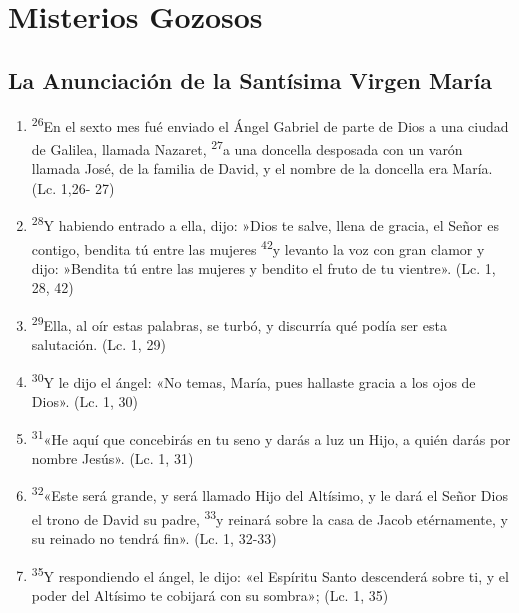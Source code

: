 \documentclass[a4paper,11pt]{article}
\begin{document}
  \section*{\hfil Misterios Gozosos \hfil}
    
    \subsection*{\hfil La Anunciación de la Santísima Virgen María \hfil}

      \begin{enumerate}
        \item \textsuperscript{26}En el sexto mes fué enviado el Ángel Gabriel de parte de Dios a una ciudad de Galilea, llamada Nazaret, \textsuperscript{27}a una 
        doncella desposada con un varón llamada José, de la familia de David, y el nombre de la doncella era María. (Lc. 1,26- 27)

        \item \textsuperscript{28}Y habiendo entrado a ella, dijo: »Dios te salve, llena de gracia, el Señor es contigo, bendita tú entre las mujeres 
        \textsuperscript{42}y levanto la voz con gran clamor y dijo: »Bendita tú entre las mujeres y bendito el fruto de tu vientre». (Lc. 1, 28, 42)

        \item \textsuperscript{29}Ella, al oír estas palabras, se turbó, y discurría qué podía ser esta salutación. (Lc. 1, 29)

        \item \textsuperscript{30}Y le dijo el ángel: «No temas, María, pues hallaste gracia a los ojos de Dios». (Lc. 1, 30)

        \item \textsuperscript{31}«He aquí que concebirás en tu seno y darás a luz un Hijo, a quién darás por nombre Jesús». (Lc. 1, 31)

        \item \textsuperscript{32}«Este será grande, y será llamado Hijo del Altísimo, y le dará el Señor Dios el trono de David su padre, 
        \textsuperscript{33}y reinará sobre la casa de Jacob etérnamente, y su reinado no tendrá fin». (Lc. 1, 32-33)

        \item \textsuperscript{35}Y respondiendo el ángel, le dijo: «el Espíritu Santo descenderá sobre ti, 
        y el poder del Altísimo te cobijará con su sombra»; (Lc. 1, 35)
        

\end{enumerate}
\end{document}
